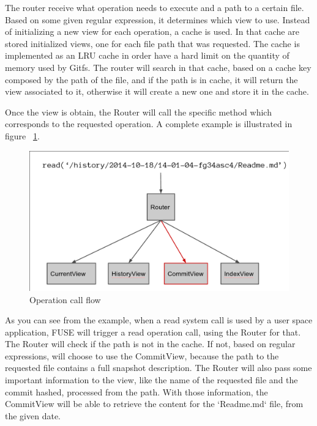 The router receive what operation needs to execute and a path to a certain file. Based on some given regular expression, it determines which view to use. Instead of initializing a new view for each operation, a cache is used. In that cache are stored initialized views, one for each file path that was requested. The cache is implemented as an LRU cache \cite{lru} in order have a hard limit on the quantity of memory used by Gitfs. The router will search in that cache, based on a cache key composed by the path of the file, and if the path is in cache, it will return the view associated to it, otherwise it will create a new one and store it in the cache.

Once the view is obtain, the Router will call the specific method which corresponds to the requested operation. A complete example is illustrated in figure ~\ref{fig:routing}.

\begin{figure}[h]
  \begin{center}
    \includegraphics[width=15cm]{layout/router.png}
  \end{center}
  \caption{Operation call flow}
  \label{fig:routing}
\end{figure}

As you can see from the example, when a read system call is used by a user space application, FUSE will trigger a read operation call, using the Router for that. The Router will check if the path is not in the cache. If not, based on regular expressions, will choose to use the CommitView, because the path to the requested file contains a full snapshot description. The Router will also pass some important information to the view, like the name of the requested file and the commit hashed, processed from the path. With those information, the CommitView will be able to retrieve the content for the `Readme.md` file, from the given date.

